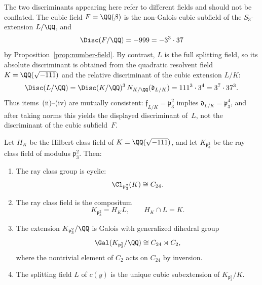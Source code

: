\begin{remark}\label{rem:disc-distinction}
The two discriminants appearing here refer to different fields and should not be conflated. The cubic field \(F=\QQ(\beta)\) is the non-Galois cubic subfield of the \(S_3\)-extension \(L/\QQ\), and
\[
\Disc(F/\QQ)=-999=-3^3\cdot 37
\]
by Proposition~\ref{prop:number-field}. By contrast, \(L\) is the full splitting field, so its absolute discriminant is obtained from the quadratic resolvent field \(K=\QQ(\sqrt{-111})\) and the relative discriminant of the cubic extension \(L/K\):
\[
\Disc(L/\QQ)=\Disc(K/\QQ)^3\,N_{K/\QQ}(\mathfrak d_{L/K})
=111^3\cdot 3^4
=3^7\cdot 37^3.
\]
Thus items~(ii)--(iv) are mutually consistent: \(\mathfrak f_{L/K}=\mathfrak p_3^2\) implies \(\mathfrak d_{L/K}=\mathfrak p_3^4\), and after taking norms this yields the displayed discriminant of~\(L\), not the discriminant of the cubic subfield~\(F\).
\end{remark}

\begin{theorem}\label{thm:ray-class}
Let \(H_K\) be the Hilbert class field of \(K=\QQ(\sqrt{-111})\), and let \(K_{\mathfrak p_3^2}\) be the ray class field of modulus \(\mathfrak p_3^2\). Then:
\begin{enumerate}
\item[(i)] The ray class group is cyclic:
\[
\Cl_{\mathfrak p_3^2}(K)\cong C_{24}.
\]
\item[(ii)] The ray class field is the compositum
\[
K_{\mathfrak p_3^2}=H_KL,
\qquad
H_K\cap L=K.
\]
\item[(iii)] The extension \(K_{\mathfrak p_3^2}/\QQ\) is Galois with generalized dihedral group
\[
\Gal(K_{\mathfrak p_3^2}/\QQ)\cong C_{24}\rtimes C_2,
\]
where the nontrivial element of \(C_2\) acts on \(C_{24}\) by inversion.
\item[(iv)] The splitting field \(L\) of \(c(y)\) is the unique cubic subextension of \(K_{\mathfrak p_3^2}/K\).
\end{enumerate}
\end{theorem}

